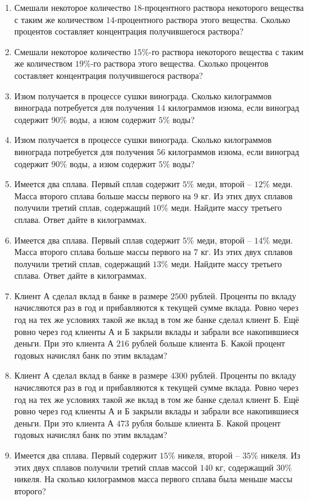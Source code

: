 \documentclass[12pt, a4paper]{article}
\begin{document}
\begin{enumerate}
		\item Смешали некоторое количество \( 18 \)-процентного раствора некоторого вещества с таким же количеством \( 14 \)-процентного раствора этого вещества. Сколько процентов составляет концентрация получившегося раствора?
		\item Смешали некоторое количество \( 15\%\)-го раствора некоторого вещества с таким же количеством \( 19\% \)-го раствора этого вещества. Сколько процентов составляет концентрация получившегося раствора?
		\item Изюм получается в процессе сушки винограда. Сколько килограммов винограда потребуется для получения \( 14 \) килограммов изюма, если виноград содержит \( 90\% \) воды, а изюм содержит \( 5\% \) воды?
		\item Изюм получается в процессе сушки винограда. Сколько килограммов винограда потребуется для получения \( 56 \) килограммов изюма, если виноград содержит \( 90\% \) воды, а изюм содержит \( 5\% \) воды?
		\item Имеется два сплава. Первый сплав содержит \( 5\% \) меди, второй – \( 12\% \) меди. Масса второго сплава больше массы первого на \( 9 \) кг. Из этих двух сплавов получили третий сплав, содержащий \( 10\% \) меди. Найдите массу третьего сплава. Ответ дайте в килограммах.
		\item Имеется два сплава. Первый сплав содержит \( 5\% \) меди, второй – \( 14\% \) меди. Масса второго сплава больше массы первого на \( 7 \) кг. Из этих двух сплавов получили третий сплав, содержащий \( 13\% \) меди. Найдите массу третьего сплава. Ответ дайте в килограммах.
		\item Клиент А сделал вклад в банке в размере \( 2500 \) рублей. Проценты по вкладу начисляются раз в год и прибавляются к текущей сумме вклада. Ровно через год на тех же условиях такой же вклад в том же банке сделал клиент Б. Ещё ровно через год клиенты А и Б закрыли вклады и забрали все накопившиеся деньги. При это клиента А \( 216 \) рублей больше клиента Б. Какой процент годовых начислял банк по этим вкладам?
		\item Клиент А сделал вклад в банке в размере \( 4300 \) рублей. Проценты по вкладу начисляются раз в год и прибавляются к текущей сумме вклада. Ровно через год на тех же условиях такой же вклад в том же банке сделал клиент Б. Ещё ровно через год клиенты А и Б закрыли вклады и забрали все накопившиеся деньги. При это клиента А \( 473 \) рубля                 больше клиента Б. Какой процент годовых начислял банк по этим вкладам?
		\item Имеется два сплава. Первый содержит \( 15\% \) никеля, второй – \( 35\% \) никеля. Из этих двух сплавов получили третий сплав массой \( 140 \) кг, содержащий \( 30\%  \) никеля. На сколько килограммов масса первого сплава была меньше массы второго?
	\end{enumerate}	
	
\end{document}
